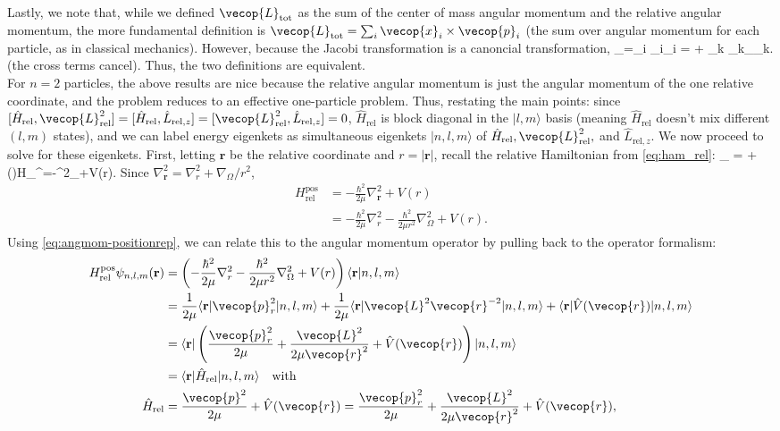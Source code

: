 Lastly, we note that, while we defined $\vecop{L}_{\text{tot}}$ as the sum of the center of mass angular momentum and the relative angular momentum, the more fundamental definition is $\vecop{L}_\text{tot}=\sum_i \vecop{x}_i\times\vecop{p}_i$ (the sum over angular momentum for each particle, as in classical mechanics). However, because the Jacobi transformation is a canoncial transformation,
\bea
    _=\sum_i _i\times {}_i = \times {} + \sum_k \vecop{\rho}_k\times {}_{\mathbf{\rho}_k}.
\eea
(the cross terms cancel). Thus, the two definitions are equivalent.\\

For $n=2$ particles, the above results are nice because the relative angular momentum is just the angular momentum of the one relative coordinate, and the problem reduces to an effective one-particle problem. Thus, restating the main points: since $[\hat{H}_\text{rel},\vecop{L}_\text{rel}^2]=[\hat{H}_\text{rel},\hat{L}_{\text{rel},z}]=[\vecop{L}^2_\text{rel}, \hat{L}_{\text{rel},z}]=0$, $\hat{H}_{\text{rel}}$ is block diagonal in the $|l,m\rangle$ basis (meaning $\hat{H}_\text{rel}$ doesn't mix different $(l,m)$ states), and we can label energy eigenkets as simultaneous eigenkets $|n,l,m\rangle$ of $\hat{H}_\text{rel}, \vecop{L}^2_\text{rel},$ and $\hat{L}_{\text{rel},z}$. We now proceed to solve for these eigenkets. First, letting $\mathbf{r}$ be the relative coordinate and $r=|\mathbf{r}|$, recall the relative Hamiltonian from \cref{eq:ham_rel}:
\bea
    _ = +()\rightarrow H_^=-\nabla^2_+V(r).
\eea
Since $\nabla^2_{\mathbf{r}} = \nabla^2_r + \nabla_{\Omega}/r^2$,
\begin{align*}
    H^{\text{pos}}_{\text{rel}} &= -\frac{\hbar^2}{2\mu}\nabla^2_\mathbf{r}+V(r) \\
    &= -\frac{\hbar^2}{2\mu}\nabla^2_r-\frac{\hbar^2}{2\mu r^2}\nabla^2_{\Omega} + V(r).
\end{align*}
Using \cref{eq:angmom-positionrep}, we can relate this to the angular momentum operator by pulling back to the operator formalism:
\begin{align*}
    H_\text{rel}^{\text{pos}}\psi_{n,l,m}(\mathbf{r}) &= \left(-\frac{\hbar^2}{2\mu}\nabla^2_r-\frac{\hbar^2}{2\mu r^2}\nabla^2_{\Omega} + V(r)\right)\langle\mathbf{r}|n,l,m\rangle\\
    &= \frac{1}{2\mu}\langle\mathbf{r}|\vecop{p}^2_{r}|n,l,m\rangle +\frac{1}{2\mu}\langle\mathbf{r}|\vecop{L}^2\vecop{r}^{-2}|n,l,m\rangle+\langle \mathbf{r}|\hat{V}(\vecop{r})|n,l,m\rangle\\
    &= \langle \mathbf{r}|\left(\frac{\vecop{p}^2_r}{2\mu}+\frac{\vecop{L}^2}{2\mu\vecop{r}^2} + \hat{V}(\vecop{r})\right)|n,l,m\rangle\\
    &=\langle \mathbf{r}|\hat{H}_\text{rel}|n,l,m\rangle\quad\text{with}\\
    \hat{H}_\text{rel}&=\frac{\vecop{p}^2}{2\mu}+\hat{V}(\vecop{r})=\frac{\vecop{p}^2_r}{2\mu}+\frac{\vecop{L}^2}{2\mu\vecop{r}^2}+\hat{V}(\vecop{r}),
\end{align*}
